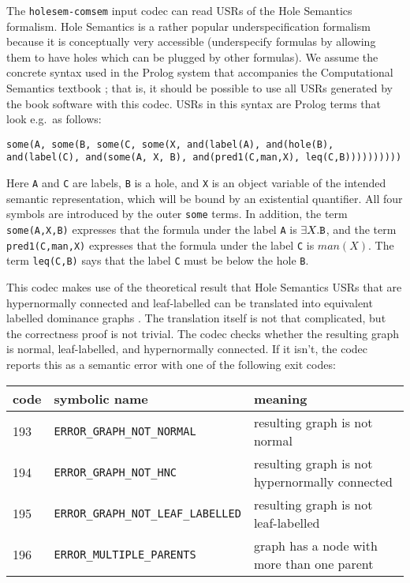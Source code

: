 The \verb?holesem-comsem? input codec can read USRs of the Hole
Semantics formalism. Hole Semantics \cite{Bos96} is a rather popular
underspecification formalism because it is conceptually very
accessible (underspecify formulas by allowing them to have holes which
can be plugged by other formulas). We assume the concrete syntax used
in the Prolog system that accompanies the Computational Semantics
textbook \cite{blackburn05:_repres_infer_natur_languag}; that is, it
should be possible to use all USRs generated by the book software with
this codec. USRs in this syntax are Prolog terms that look e.g.\ as
follows:

\begin{verbatim}
some(A, some(B, some(C, some(X, and(label(A), and(hole(B),
and(label(C), and(some(A, X, B), and(pred1(C,man,X), leq(C,B))))))))))
\end{verbatim}

Here \verb?A? and \verb?C? are labels, \verb?B? is a hole, and
\verb?X? is an object variable of the intended semantic
representation, which will be bound by an existential quantifier. All
four symbols are introduced by the outer \verb?some? terms. In
addition, the term \verb?some(A,X,B)? expresses that the formula under
the label \verb?A? is $\exists X. \verb?B?$, and the term
\verb?pred1(C,man,X)? expresses that the formula under the label
\verb?C? is $man(X)$. The term \verb?leq(C,B)? says that the label
\verb?C? must be below the hole \verb?B?.

This codec makes use of the theoretical result that Hole Semantics
USRs that are hypernormally connected and leaf-labelled can be
translated into equivalent labelled dominance graphs
\cite{KolNieTha03}. The translation itself is not that complicated,
but the correctness proof is not trivial. The codec checks whether the
resulting graph is normal, leaf-labelled, and hypernormally
connected. If it isn't, the codec reports this as a semantic error
with one of the following exit codes:

\begin{tabular}{lll}
code & symbolic name & meaning \\ \hline
193 &  \verb?ERROR_GRAPH_NOT_NORMAL? & resulting graph is not normal \\
194 &  \verb?ERROR_GRAPH_NOT_HNC? & resulting graph is not hypernormally
connected \\
195 &  \verb?ERROR_GRAPH_NOT_LEAF_LABELLED? & resulting graph is not
leaf-labelled \\
196 &  \verb?ERROR_MULTIPLE_PARENTS? & graph has a node with more than one
parent 
\end{tabular}

